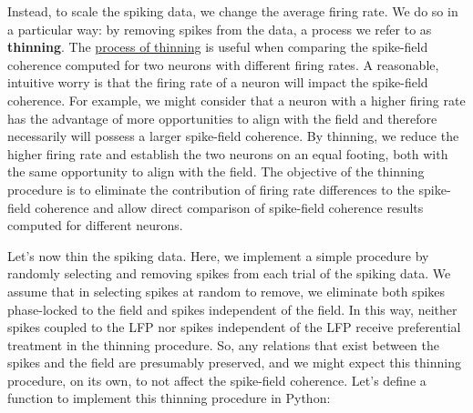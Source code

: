 \documentclass[11pt]{article}
\begin{document}
Instead, to scale the spiking data, we change the average firing rate.
We do so in a particular way: by removing spikes from the data, a
process we refer to as \textbf{thinning}. The
\href{https://www.ncbi.nlm.nih.gov/pmc/articles/PMC3800189/}{process of
thinning} is useful when comparing the spike-field coherence computed
for two neurons with different firing rates. A reasonable, intuitive
worry is that the firing rate of a neuron will impact the spike-field
coherence. For example, we might consider that a neuron with a higher
firing rate has the advantage of more opportunities to align with the
field and therefore necessarily will possess a larger spike-field
coherence. By thinning, we reduce the higher firing rate and establish
the two neurons on an equal footing, both with the same opportunity to
align with the field. The objective of the thinning procedure is to
eliminate the contribution of firing rate differences to the spike-field
coherence and allow direct comparison of spike-field coherence results
computed for different neurons.

Let's now thin the spiking data. Here, we implement a simple procedure
by randomly selecting and removing spikes from each trial of the spiking
data. We assume that in selecting spikes at random to remove, we
eliminate both spikes phase-locked to the field and spikes independent
of the field. In this way, neither spikes coupled to the LFP nor spikes
independent of the LFP receive preferential treatment in the thinning
procedure. So, any relations that exist between the spikes and the field
are presumably preserved, and we might expect this thinning procedure,
on its own, to not affect the spike-field coherence. Let's define a
function to implement this thinning procedure in Python:
\end{document}
